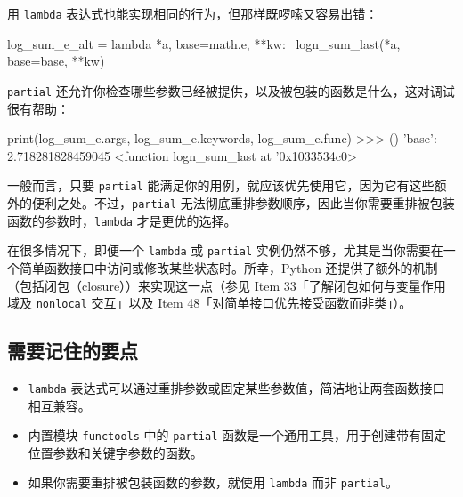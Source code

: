 用 \texttt{lambda} 表达式也能实现相同的行为，但那样既啰嗦又容易出错：

\begin{codebox}[python]
log_sum_e_alt = lambda *a, base=math.e, **kw: \
    logn_sum_last(*a, base=base, **kw)
\end{codebox}

\texttt{partial} 还允许你检查哪些参数已经被提供，以及被包装的函数是什么，这对调试很有帮助：

\begin{codebox}[python]
print(log_sum_e.args, log_sum_e.keywords, log_sum_e.func)
>>>
() {'base': 2.718281828459045} <function logn_sum_last at
'0x1033534c0>
\end{codebox}

一般而言，只要 \texttt{partial} 能满足你的用例，就应该优先使用它，因为它有这些额外的便利之处。不过，\texttt{partial} 无法彻底重排参数顺序，因此当你需要重排被包装函数的参数时，\texttt{lambda} 才是更优的选择。

在很多情况下，即便一个 \texttt{lambda} 或 \texttt{partial} 实例仍然不够，尤其是当你需要在一个简单函数接口中访问或修改某些状态时。所幸，Python 还提供了额外的机制（包括闭包（closure））来实现这一点（参见 Item 33「了解闭包如何与变量作用域及 \texttt{nonlocal} 交互」以及 Item 48「对简单接口优先接受函数而非类」）。

\subsection{需要记住的要点}

\begin{itemize}
\item \texttt{lambda} 表达式可以通过重排参数或固定某些参数值，简洁地让两套函数接口相互兼容。
\item 内置模块 \texttt{functools} 中的 \texttt{partial} 函数是一个通用工具，用于创建带有固定位置参数和关键字参数的函数。
\item 如果你需要重排被包装函数的参数，就使用 \texttt{lambda} 而非 \texttt{partial}。
\end{itemize}
